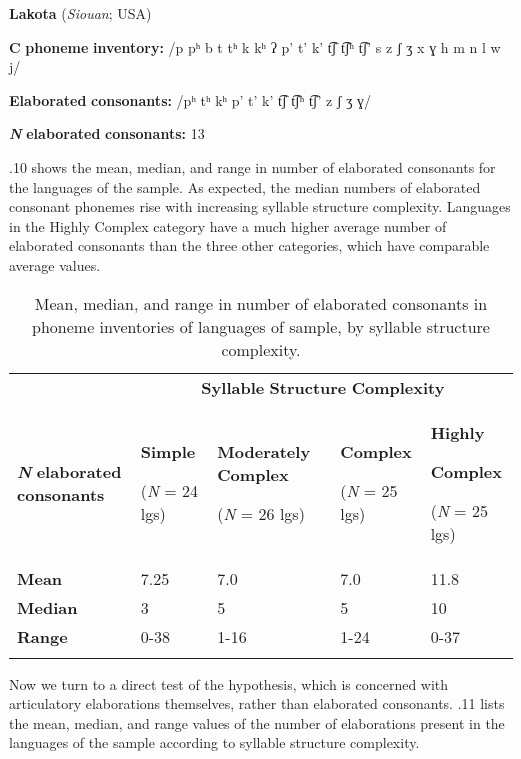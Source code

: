 \ea\label{ex:(4.26)}
  \textbf{Lakota} (\textit{Siouan}; USA)

\textbf{C} \textbf{phoneme} \textbf{inventory:} /p pʰ b t tʰ k kʰ ʔ p’ t’ k’ t͡ʃ t͡ʃʰ t͡ʃ’ s z ʃ ʒ x ɣ h m n l w j/

\textbf{Elaborated} \textbf{consonants:} /pʰ tʰ kʰ p’ t’ k’ t͡ʃ t͡ʃʰ t͡ʃ’ z ʃ ʒ ɣ/

\textbf{\textit{N}} \textbf{elaborated} \textbf{consonants:} 13
\z

  .10 shows the mean, median, and range in number of elaborated consonants for the languages of the sample. As expected, the median numbers of elaborated consonant phonemes rise with increasing syllable structure complexity. Languages in the Highly Complex category have a much higher average number of elaborated consonants than the three other categories, which have comparable average values.

\begin{table}
\begin{tabularx}{\textwidth}{XXXXX}
 & \multicolumn{4}{c}{ \textbf{Syllable} \textbf{Structure} \textbf{Complexity}}\\
\lsptoprule
\textbf{\textit{N}} \textbf{elaborated} \textbf{consonants} & { \textbf{Simple}}

 (\textit{N} = 24 lgs) & { \textbf{Moderately} \textbf{Complex}}

 (\textit{N} = 26 lgs) & { \textbf{Complex}}

 (\textit{N} = 25 lgs) & { \textbf{Highly} }

{ \textbf{Complex}}

 (\textit{N} = 25 lgs)\\
\textbf{Mean} & 7.25 & 7.0 & 7.0 & 11.8\\
\textbf{Median} & 3 & 5 & 5 & 10\\
\textbf{Range} & 0-38 & 1-16 & 1-24 & 0-37\\
\lspbottomrule
\end{tabularx}
\caption{\label{4.10}Mean, median, and range in number of elaborated consonants in phoneme inventories of languages of sample, by syllable structure complexity.}
\end{table}

  Now we turn to a direct test of the hypothesis, which is concerned with articulatory elaborations themselves, rather than elaborated consonants. .11 lists the mean, median, and range values of the number of elaborations present in the languages of the sample according to syllable structure complexity.

